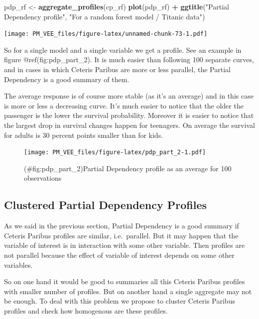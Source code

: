 \documentclass[12pt,]{krantz}
\newenvironment{Shaded}{\begin{snugshade}}{\end{snugshade}}
\newcommand{\KeywordTok}[1]{\textcolor[rgb]{0.13,0.29,0.53}{\textbf{#1}}}
\newcommand{\NormalTok}[1]{#1}
\newcommand{\OperatorTok}[1]{\textcolor[rgb]{0.81,0.36,0.00}{\textbf{#1}}}
\newcommand{\StringTok}[1]{\textcolor[rgb]{0.31,0.60,0.02}{#1}}
\begin{document}
\begin{Shaded}
\begin{Highlighting}[]
\NormalTok{pdp_rf <-}\StringTok{ }\KeywordTok{aggregate_profiles}\NormalTok{(cp_rf)}
\KeywordTok{plot}\NormalTok{(pdp_rf) }\OperatorTok{+}
\StringTok{  }\KeywordTok{ggtitle}\NormalTok{(}\StringTok{"Partial Dependency profile"}\NormalTok{, }\StringTok{"For a random forest model / Titanic data"}\NormalTok{) }
\end{Highlighting}
\end{Shaded}

\texttt{[image: PM\_VEE\_files/figure-latex/unnamed-chunk-73-1.pdf]}

So for a single model and a single variable we get a profile. See an example in figure @ref(fig:pdp\_part\_2). It is much easier than following 100 separate curves, and in cases in which Ceteris Paribus are more or less parallel, the Partial Dependency is a good summary of them.

The average response is of course more stable (as it's an average) and in this case is more or less a decreasing curve. It's much easier to notice that the older the passenger is the lower the survival probability.
Moreover it is easier to notice that the largest drop in survival changes happen for teenagers. On average the survival for adults is 30 percent points smaller than for kids.

\begin{figure}
\centering
\texttt{[image: PM\_VEE\_files/figure-latex/pdp\_part\_2-1.pdf]}
\caption{(\#fig:pdp\_part\_2)Partial Dependency profile as an average for 100 observations}
\end{figure}

\hypertarget{clustered-partial-dependency-profiles}{%
\subsection{Clustered Partial Dependency Profiles}\label{clustered-partial-dependency-profiles}}

As we said in the previous section, Partial Dependency is a good summary if Ceteris Paribus profiles are similar, i.e.~parallel. But it may happen that the variable of interest is in interaction with some other variable. Then profiles are not parallel because the effect of variable of interest depends on some other variables.

So on one hand it would be good to summaries all this Ceteris Paribus profiles with smaller number of profiles. But on another hand a single aggregate may not be enough.
To deal with this problem we propose to cluster Ceteris Paribus profiles and check how homogenous are these profiles.
\end{document}
